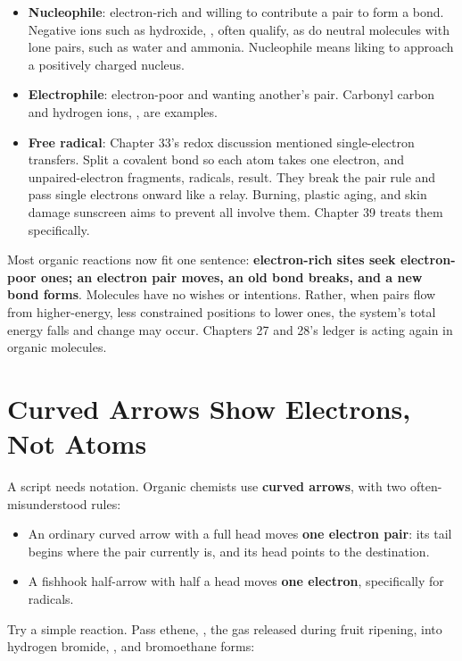 \begin{itemize}[itemsep=2pt]
\item \textbf{Nucleophile}: electron-rich and willing to contribute a pair to form a bond. Negative ions such as hydroxide, , often qualify, as do neutral molecules with lone pairs, such as water and ammonia. Nucleophile means liking to approach a positively charged nucleus.
\item \textbf{Electrophile}: electron-poor and wanting another's pair. Carbonyl carbon and hydrogen ions, , are examples.
\item \textbf{Free radical}: Chapter 33's redox discussion mentioned single-electron transfers. Split a covalent bond so each atom takes one electron, and unpaired-electron fragments, radicals, result. They break the pair rule and pass single electrons onward like a relay. Burning, plastic aging, and skin damage sunscreen aims to prevent all involve them. Chapter 39 treats them specifically.
\end{itemize}

Most organic reactions now fit one sentence: \textbf{electron-rich sites seek electron-poor ones; an electron pair moves, an old bond breaks, and a new bond forms}. Molecules have no wishes or intentions. Rather, when pairs flow from higher-energy, less constrained positions to lower ones, the system's total energy falls and change may occur. Chapters 27 and 28's ledger is acting again in organic molecules.

\section{Curved Arrows Show Electrons, Not Atoms}

A script needs notation. Organic chemists use \textbf{curved arrows}, with two often-misunderstood rules:

\begin{itemize}[itemsep=2pt]
\item An ordinary curved arrow with a full head moves \textbf{one electron pair}: its tail begins where the pair currently is, and its head points to the destination.
\item A fishhook half-arrow with half a head moves \textbf{one electron}, specifically for radicals.
\end{itemize}

Try a simple reaction. Pass ethene, , the gas released during fruit ripening, into hydrogen bromide, , and bromoethane forms:

